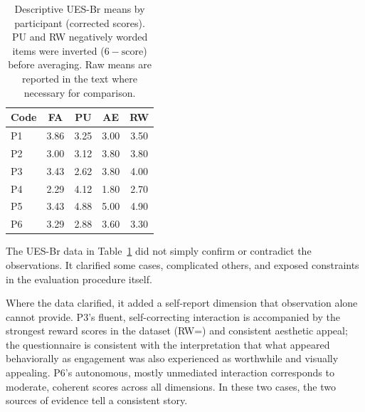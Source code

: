 \documentclass{llncs}
\begin{document}
\begin{table}[t]
  \caption{Descriptive UES-Br means by participant (corrected scores). PU and RW
  negatively worded items were inverted ($6 - \text{score}$) before averaging.
  Raw means are reported in the text where necessary for comparison.}
  \label{tab:uesbr}
  \begin{tabular}{lcccc}
    \toprule
    \textbf{Code} & \textbf{FA} & \textbf{PU} & \textbf{AE} & \textbf{RW} \\
    \midrule
    P1 & 3.86 & 3.25 & 3.00 & 3.50 \\
    P2 & 3.00 & 3.12 & 3.80 & 3.80 \\
    P3 & 3.43 & 2.62 & 3.80 & 4.00 \\
    P4 & 2.29 & 4.12 & 1.80 & 2.70 \\
    P5 & 3.43 & 4.88 & 5.00 & 4.90 \\
    P6 & 3.29 & 2.88 & 3.60 & 3.30 \\
    \bottomrule
  \end{tabular}
\end{table}

The UES-Br data in Table~\ref{tab:uesbr} did not simply confirm or contradict the
observations. It clarified some cases, complicated others, and exposed constraints in the
evaluation procedure itself.

Where the data clarified, it added a self-report dimension that observation alone cannot
provide. P3's fluent, self-correcting interaction is accompanied by the strongest reward
scores in the dataset (RW\thinspace=) and consistent aesthetic
appeal; the questionnaire is consistent with the interpretation that what appeared behaviorally as engagement was also experienced as worthwhile and visually appealing. P6's autonomous, mostly
unmediated interaction corresponds to moderate, coherent scores across all dimensions.
In these two cases, the two sources of evidence tell a consistent story.
\end{document}
